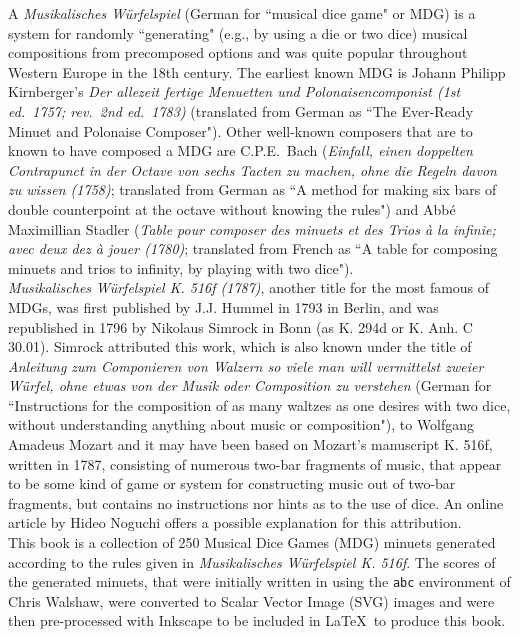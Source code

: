 \documentclass[letterpaper,x11names,svgnames,10pt]{article}
\begin{document}
{A {\it Musikalisches W\"{u}rfelspiel} (German for ``musical dice game" or MDG) is a system for randomly ``generating" (e.g., by using a die or two dice) musical compositions from precomposed options and was quite popular throughout Western Europe in the 18th century.  The earliest known MDG is Johann Philipp Kirnberger's {\em Der allezeit fertige Menuetten und Polonaisencomponist (1st ed.\ 1757; rev.\ 2nd ed.\ 1783)} (translated from German as ``The Ever-Ready Minuet and Polonaise Composer").  Other well-known composers that are to known to have composed a MDG are C.P.E.\ Bach ({\em Einfall, einen doppelten Contrapunct in der Octave von sechs Tacten zu machen, ohne die Regeln davon zu wissen (1758)}; translated from German as ``A method for making six bars of double counterpoint at the octave without knowing the rules") and Abb\'{e} Maximillian Stadler ({\em Table pour composer des minuets et des Trios \`{a} la infinie; avec deux dez \`{a} jouer (1780)}; translated from French as ``A table for composing minuets and trios to infinity, by playing with two dice"). \\

{\it Musikalisches W\"{u}rfelspiel K. 516f (1787)}, another title for the most famous of MDGs, was first published by J.J. Hummel in 1793 in Berlin, and was republished in 1796 by Nikolaus Simrock in Bonn (as K. 294d or K. Anh. C 30.01).  Simrock attributed this work, which is also known under the title of {\em Anleitung zum Componieren von Walzern so viele man will vermittelst zweier Würfel, ohne etwas von der Musik oder Composition zu verstehen} (German for ``Instructions for the composition of as many waltzes as one desires with two dice, without understanding anything about music or composition"), to Wolfgang Amadeus Mozart and it may have been based on Mozart's manuscript K. 516f, written in 1787, consisting of numerous two-bar fragments of music, that appear to be some kind of game or system for constructing music out of two-bar fragments, but contains no instructions nor hints as to the use of dice.  An online article by Hideo Noguchi offers a possible explanation for this attribution. \\

This book is a collection of 250 Musical Dice Games (MDG) minuets generated according to the rules given in {\it Musikalisches W\"{u}rfelspiel K. 516f}.  The scores of the generated minuets, that were initially written in using the \texttt{abc} environment of Chris Walshaw, were converted to Scalar Vector Image (SVG) images and were then pre-processed with Inkscape to be included in \LaTeX\ to produce this book.


}
\end{document}
